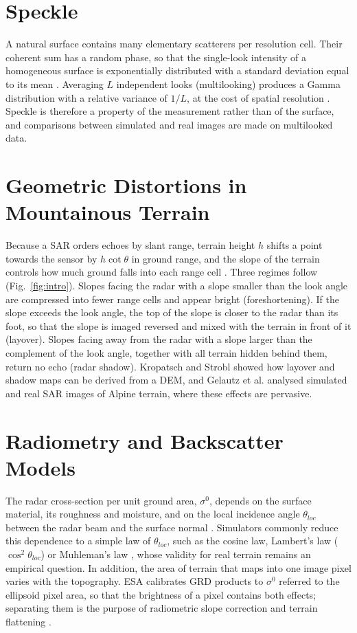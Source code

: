 \section{Speckle}
A natural surface contains many elementary scatterers per resolution cell. Their coherent sum has a random phase, so
that the single-look intensity of a homogeneous surface is exponentially distributed with a standard deviation equal to
its mean \cite{goodman1976}. Averaging $L$ independent looks (multilooking) produces a Gamma distribution with a
relative variance of $1/L$, at the cost of spatial resolution \cite{oliver1998}. Speckle is therefore a property of the
measurement rather than of the surface, and comparisons between simulated and real images are made on multilooked
data.

\section{Geometric Distortions in Mountainous Terrain}
Because a SAR orders echoes by slant range, terrain height $h$ shifts a point towards the sensor by $h\cot\theta$ in
ground range, and the slope of the terrain controls how much ground falls into each range cell
\cite{leberl1990}. Three regimes follow (Fig.~\ref{fig:intro}). Slopes facing the radar with a slope smaller than the
look angle are compressed into fewer range cells and appear bright (foreshortening). If the slope exceeds the look
angle, the top of the slope is closer to the radar than its foot, so that the slope is imaged reversed and mixed with
the terrain in front of it (layover). Slopes facing away from the radar with a slope larger than the complement of the
look angle, together with all terrain hidden behind them, return no echo (radar shadow). Kropatsch and Strobl
\cite{kropatsch1990} showed how layover and shadow maps can be derived from a DEM, and Gelautz et al.
\cite{gelautz1998} analysed simulated and real SAR images of Alpine terrain, where these effects are pervasive.

\section{Radiometry and Backscatter Models}
The radar cross-section per unit ground area, $\sigma^0$, depends on the surface material, its roughness and moisture,
and on the local incidence angle $\theta_{loc}$ between the radar beam and the surface normal
\cite{ulaby1982,ulaby1989}. Simulators commonly reduce this dependence to a simple law of $\theta_{loc}$, such as the
cosine law, Lambert's law ($\cos^2\theta_{loc}$) or Muhleman's law \cite{muhleman1964}, whose validity for real
terrain remains an empirical question. In addition, the area of terrain that maps into one image pixel varies with the
topography. ESA calibrates GRD products to $\sigma^0$ referred to the ellipsoid pixel area, so that the brightness of a
pixel contains both effects; separating them is the purpose of radiometric slope correction and terrain flattening
\cite{ulander1996,small2011,frey2013}.

